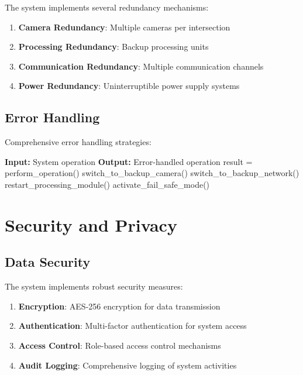 The system implements several redundancy mechanisms:

\begin{enumerate}
    \item \textbf{Camera Redundancy}: Multiple cameras per intersection
    \item \textbf{Processing Redundancy}: Backup processing units
    \item \textbf{Communication Redundancy}: Multiple communication channels
    \item \textbf{Power Redundancy}: Uninterruptible power supply systems
\end{enumerate}

\subsection{Error Handling}

Comprehensive error handling strategies:

\begin{algorithmic}[1]
\STATE \textbf{Input:} System operation
\STATE \textbf{Output:} Error-handled operation
\STATE 
\STATE result = perform\_operation()
    \STATE switch\_to\_backup\_camera()
    \STATE switch\_to\_backup\_network()
    \STATE restart\_processing\_module()
    \STATE activate\_fail\_safe\_mode()
\ENDIF
\end{algorithmic}

\section{Security and Privacy}

\subsection{Data Security}

The system implements robust security measures:

\begin{enumerate}
    \item \textbf{Encryption}: AES-256 encryption for data transmission
    \item \textbf{Authentication}: Multi-factor authentication for system access
    \item \textbf{Access Control}: Role-based access control mechanisms
    \item \textbf{Audit Logging}: Comprehensive logging of system activities
\end{enumerate}

